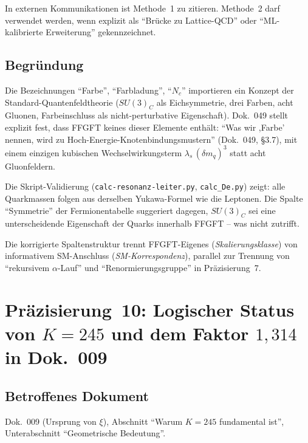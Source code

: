 In externen Kommunikationen ist Methode~1 zu zitieren. Methode~2 darf
verwendet werden, wenn explizit als \enquote{Brücke zu Lattice-QCD}
oder \enquote{ML-kalibrierte Erweiterung} gekennzeichnet.

\subsection*{Begründung}

Die Bezeichnungen \enquote{Farbe}, \enquote{Farbladung}, \enquote{$N_c$}
importieren ein Konzept der Standard-Quantenfeldtheorie ($SU(3)_C$ als
Eichsymmetrie, drei Farben, acht Gluonen, Farbeinschluss als
nicht-perturbative Eigenschaft). Dok.~049 stellt explizit fest, dass
FFGFT keines dieser Elemente enthält: \enquote{Was wir ,Farbe' nennen,
wird zu Hoch-Energie-Knotenbindungsmustern} (Dok.~049, §3.7), mit
einem einzigen kubischen Wechselwirkungsterm
$\lambda_s\,(\delta m_q)^3$ statt acht Gluonfeldern.

Die Skript-Validierung (\texttt{calc-resonanz-leiter.py},
\texttt{calc\_De.py}) zeigt: alle Quarkmassen folgen aus derselben
Yukawa-Formel wie die Leptonen. Die Spalte \enquote{Symmetrie} der
Fermionentabelle suggeriert dagegen, $SU(3)_C$ sei eine
unterscheidende Eigenschaft der Quarks innerhalb FFGFT -- was nicht
zutrifft.

Die korrigierte Spaltenstruktur trennt FFGFT-Eigenes
(\emph{Skalierungsklasse}) von informativem SM-Anschluss
(\emph{SM-Korrespondenz}), parallel zur Trennung von
\enquote{rekursivem $\alpha$-Lauf} und \enquote{Renormierungsgruppe} in
Präzisierung~7.

\section{\texorpdfstring{Präzisierung~10: Logischer Status von $K = 245$ und dem Faktor $1{,}314$ in Dok.~009}{Präzisierung 10: Logischer Status von K = 245 und dem Faktor 1.314 in Dok. 009}}

\subsection*{Betroffenes Dokument}

Dok.~009 (Ursprung von $\xi$), Abschnitt \enquote{Warum $K = 245$ fundamental ist},
Unterabschnitt \enquote{Geometrische Bedeutung}.

